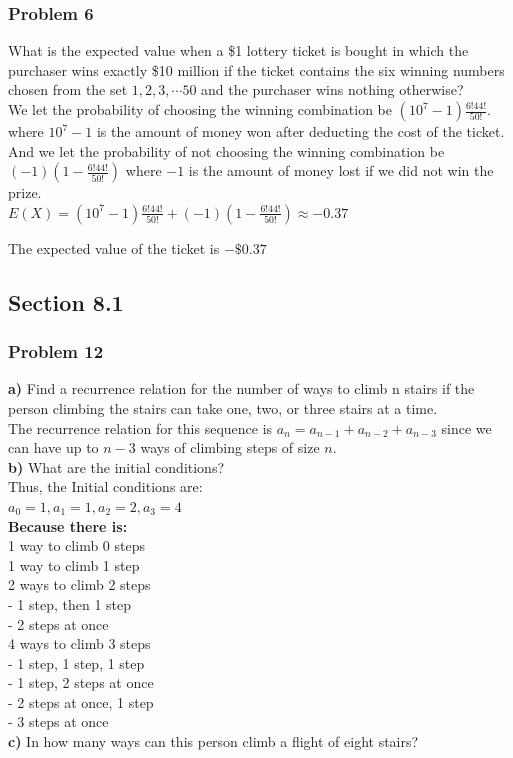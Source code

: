 \documentclass[fontsize=11pt]{scrartcl} %
\begin{document}
\subsubsection*{Problem 6}
What is the expected value when a \$1 lottery ticket is bought in which the purchaser wins exactly \$10 million if the ticket contains the six winning numbers chosen from the set ${1, 2, 3, \cdots 50}$ and the purchaser wins nothing otherwise?\\

We let the probability of choosing the winning combination be $(10^7 - 1)\frac{6!44!}{50!}$.\\ where $10^7 -1$ is the amount of money won after deducting the cost of the ticket.\\
And we let the probability of not choosing the winning combination be $(-1)(1 - \frac{6!44!}{50!})$ where $-1$ is the amount of money lost if we did not win the prize.\\

$E(X) = (10^7 - 1)\frac{6!44!}{50!} + (-1)(1 - \frac{6!44!}{50!}) \approx -0.37 $

The expected value of the ticket is $-\$0.37$\\
\subsection*{Section 8.1}

\subsubsection*{Problem 12}
\textbf{a)} Find a recurrence relation for the number of ways to climb n stairs if the person climbing the stairs can take one, two, or three stairs at a time.\\

The recurrence relation for this sequence is $a_n = a_{n-1} + a_{n-2} + a_{n-3}$ since we can have up to $n-3$ ways of climbing steps of size $n$.\\

\textbf{b)} What are the initial conditions?\\
Thus, the Initial conditions are:\\
$a_0 = 1, a_1 = 1, a_2 = 2, a_3 = 4$\\

\textbf{Because there is:}\\
1 way to climb 0 steps\\
1 way to climb 1 step\\
2 ways to climb 2 steps\\
- 1 step, then 1 step\\
- 2 steps at once\\
4 ways to climb 3 steps\\
- 1 step, 1 step, 1 step\\
- 1 step, 2 steps at once\\
- 2 steps at once, 1 step\\
- 3 steps at once\\ 
\textbf{c)} In how many ways can this person climb a flight of eight stairs?\\ 
\end{document}
